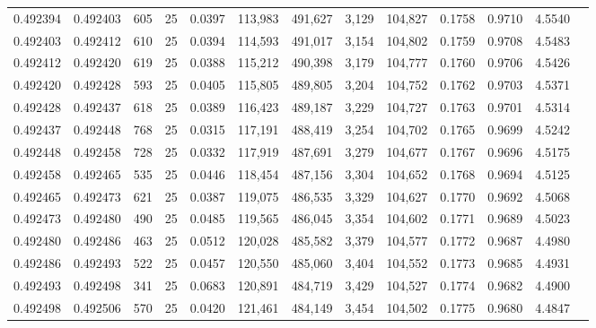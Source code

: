 \begin{tabular}{rrrrrrrrrrrrr}
0.492394 & 0.492403 &   605 &  25 &                                     0.0397 & 113,983 & 491,627 &   3,129 & 104,827 & 0.1758 & 0.9710 & 4.5540 \\
0.492403 & 0.492412 &   610 &  25 &                                     0.0394 & 114,593 & 491,017 &   3,154 & 104,802 & 0.1759 & 0.9708 & 4.5483 \\
0.492412 & 0.492420 &   619 &  25 &                                     0.0388 & 115,212 & 490,398 &   3,179 & 104,777 & 0.1760 & 0.9706 & 4.5426 \\
0.492420 & 0.492428 &   593 &  25 &                                     0.0405 & 115,805 & 489,805 &   3,204 & 104,752 & 0.1762 & 0.9703 & 4.5371 \\
0.492428 & 0.492437 &   618 &  25 &                                     0.0389 & 116,423 & 489,187 &   3,229 & 104,727 & 0.1763 & 0.9701 & 4.5314 \\
0.492437 & 0.492448 &   768 &  25 &                                     0.0315 & 117,191 & 488,419 &   3,254 & 104,702 & 0.1765 & 0.9699 & 4.5242 \\
0.492448 & 0.492458 &   728 &  25 &                                     0.0332 & 117,919 & 487,691 &   3,279 & 104,677 & 0.1767 & 0.9696 & 4.5175 \\
0.492458 & 0.492465 &   535 &  25 &                                     0.0446 & 118,454 & 487,156 &   3,304 & 104,652 & 0.1768 & 0.9694 & 4.5125 \\
0.492465 & 0.492473 &   621 &  25 &                                     0.0387 & 119,075 & 486,535 &   3,329 & 104,627 & 0.1770 & 0.9692 & 4.5068 \\
0.492473 & 0.492480 &   490 &  25 &                                     0.0485 & 119,565 & 486,045 &   3,354 & 104,602 & 0.1771 & 0.9689 & 4.5023 \\
0.492480 & 0.492486 &   463 &  25 &                                     0.0512 & 120,028 & 485,582 &   3,379 & 104,577 & 0.1772 & 0.9687 & 4.4980 \\
0.492486 & 0.492493 &   522 &  25 &                                     0.0457 & 120,550 & 485,060 &   3,404 & 104,552 & 0.1773 & 0.9685 & 4.4931 \\
0.492493 & 0.492498 &   341 &  25 &                                     0.0683 & 120,891 & 484,719 &   3,429 & 104,527 & 0.1774 & 0.9682 & 4.4900 \\
0.492498 & 0.492506 &   570 &  25 &                                     0.0420 & 121,461 & 484,149 &   3,454 & 104,502 & 0.1775 & 0.9680 & 4.4847 \\

\end{tabular}
